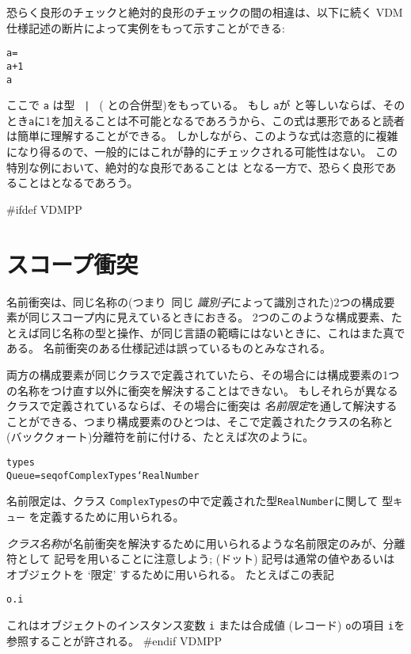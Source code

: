\documentclass[\pformat,12pt]{jarticle}
\begin{document}
恐らく良形のチェックと絶対的良形のチェックの間の相違は、以下に続く VDM 仕様記述の断片によって実例をもって示すことができる:
\begin{alltt}
    a =  
    a + 1 
     a
\end{alltt}
ここで {\tt a} は型 {\tt {} | } ( との合併型)をもっている。 
もし {\tt a}が  と等しいならば、そのとき{\tt a}に1を加えることは不可能となるであろうから、この式は悪形であると読者は簡単に理解することができる。
しかしながら、このような式は恣意的に複雑になり得るので、一般的にはこれが静的にチェックされる可能性はない。
この特別な例において、絶対的な良形であることは  となる一方で、恐らく良形であることはとなるであろう。

#ifdef VDMPP
\section{スコープ衝突}
\label{sec:nameconflicts}

名前衝突は、同じ名称の(つまり\ 同じ {\em 識別子}によって識別された)2つの構成要素が同じスコープ内に見えているときにおきる。 
2つのこのような構成要素、たとえば同じ名称の型と操作、が同じ言語の範疇にはないときに、これはまた真である。
名前衝突のある仕様記述は誤っているものとみなされる。

両方の構成要素が同じクラスで定義されていたら、その場合には構成要素の1つの名称をつけ直す以外に衝突を解決することはできない。
もしそれらが異なるクラスで定義されているならば、その場合に衝突は {\em 名前限定}を通して解決することができる、つまり構成要素のひとつは、そこで定義されたクラスの名称と (バッククォート)分離符を前に付ける、たとえば次のように。
  \begin{alltt}
    types
      Queue = seq of ComplexTypes`RealNumber
  \end{alltt}
名前限定は、クラス {\tt ComplexTypes}の中で定義された型{\tt RealNumber}に関して 型{\tt キュー} を定義するために用いられる。

{\em クラス名称}が名前衝突を解決するために用いられるような名前限定のみが、分離符として 記号を用いることに注意しよう; (ドット) 記号は通常の値やあるいはオブジェクトを `限定' するために用いられる。
たとえばこの表記
  \begin{alltt}
    o.i
  \end{alltt}
これはオブジェクトのインスタンス変数 {\tt i} または合成値 (レコード) {\tt o}の項目 {\tt i}を参照することが許される。
#endif VDMPP
\end{document}
